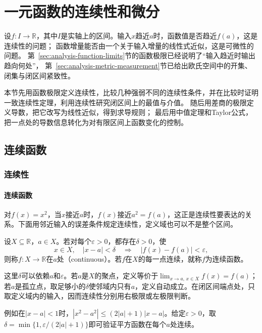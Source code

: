 \section{一元函数的连续性和微分}
\label{sec:analysis-local-models}

设$f:I\to\mathbb R$，其中$I$是实轴上的区间。输入$x$趋近$a$时，函数值是否趋近$f(a)$，这是连续性的问题；
函数增量能否由一个关于输入增量的线性式近似，这是可微性的问题。
第~\ref{sec:analysis-function-limits}节的函数极限已经说明了“输入趋近时输出趋向何处”，
第~\ref{sec:analysis-metric-measurement}节已给出欧氏空间中的开集、闭集与闭区间紧致性。

本节先用函数极限定义连续性，比较几种强弱不同的连续性条件，并在比较时证明一致连续性定理，利用连续性研究闭区间上的最值与介值。
随后用差商的极限定义导数，把它改写为线性近似，得到求导规则；
最后用中值定理和Taylor公式，把一点处的导数信息转化为对有限区间上函数变化的控制。

\subsection{连续函数}
\label{sec:analysis-metric-continuity-extrema}

\subsubsection{连续性}

\paragraph{连续函数}
对$f(x)=x^2$，当$x$接近$a$时，$f(x)$接近$a^2=f(a)$，这正是连续性要表达的关系。下面用邻近输入的误差条件规定连续性，定义域也可以不是整个区间。
\begin{definition}[连续函数]
\label{def:analysis-continuity}
设$X\subseteq\mathbb R$，$a\in X$。若对每个$\varepsilon>0$，都存在$\delta>0$，使
\[
 x\in X,\quad |x-a|<\delta
 \quad\Longrightarrow\quad |f(x)-f(a)|<\varepsilon,
\]
则称$f:X\to\mathbb R$在$a$处（continuous）。若$f$在$X$的每一点连续，就称$f$为连续函数。
\end{definition}
这里$\delta$可以依赖$a$和$\varepsilon$。若$a$是$X$的聚点，定义等价于$\lim_{x\to a,\,x\in X}f(x)=f(a)$；若$a$是孤立点，取足够小的$\delta$使邻域内只有$a$，定义自动成立。在闭区间端点处，只取定义域内的输入，因而连续性分别用右极限或左极限判断。

例如在$|x-a|<1$时，$|x^2-a^2|\leq(2|a|+1)|x-a|$。给定$\varepsilon>0$，取$\delta=\min\{1,\varepsilon/(2|a|+1)\}$即可验证平方函数在每个$a$处连续。

